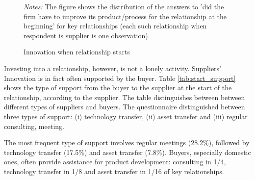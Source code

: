 \usepackage{}\documentclass[final, dvipsnames, authoryear,12pt]{elsarticle}
\begin{document}
    
 \begin{figure}[h]    
    \begin{center}
    \caption{Innovation when relationship starts}  
     \label{fig:innov}
    \end{center}
    {\footnotesize \textit{Notes:} The figure shows the distribution of the answers to ’did the firm have to improve its product/process for the relationship at the beginning’ for key relationships (each such relationship when respondent is supplier is one observation).}     
\end{figure}   
    
Investing into a relationship, however, is not a lonely activity. Suppliers' Innovation is in fact often supported by the buyer. Table \ref{tab:start_support} shows the type of support from the buyer to the supplier at the start of the relationship, according to the supplier. The table distinguishes between between different types of suppliers and buyers. The questionnaire distinguished between three types of support: (i) technology transfer, (ii) asset transfer and (iii) regular consulting, meeting.

The most frequent type of support involves regular meetings (28.2\%), followed by technology transfer (17.5\%) and asset transfer (7.8\%). Buyers, especially domestic ones, often provide assistance for product development: consulting in 1/4, technology transfer in 1/8 and asset transfer in 1/16 of key relationships.
\end{document}
